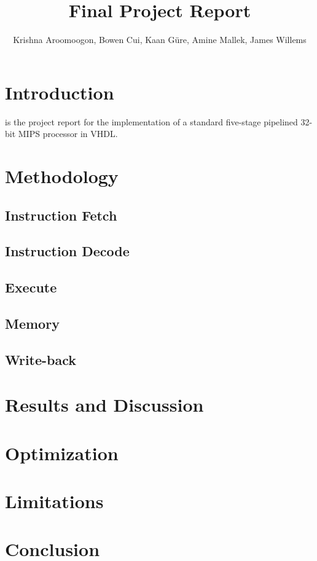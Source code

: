 \documentclass[lettersize,journal]{IEEEtran}
\begin{document}
\title{Final Project Report}

\author{Krishna Aroomoogon, Bowen Cui, Kaan G\"{u}re, Amine Mallek, James Willems}


\maketitle


\section{Introduction}
 is the project report for the implementation of a standard five-stage pipelined 32-bit MIPS processor in VHDL.

\section{Methodology}
\subsection{Instruction Fetch}

\subsection{Instruction Decode}

\subsection{Execute}

\subsection{Memory}

\subsection{Write-back}


\section{Results and Discussion}

\section{Optimization}

\section{Limitations}

\section{Conclusion}
\end{document}
